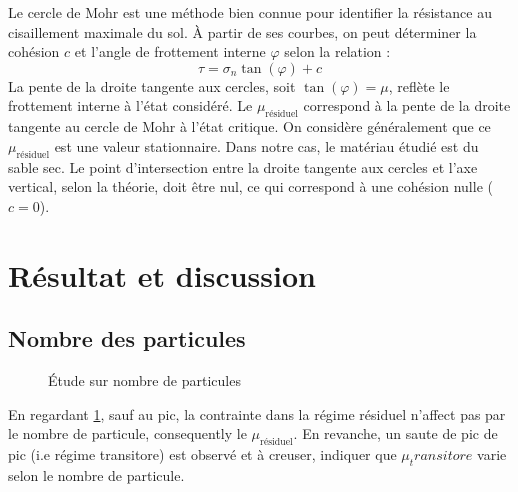 \documentclass[5p,authoryear,square]{elsarticle}
\begin{document}
Le cercle de Mohr est une méthode bien connue pour identifier la résistance au cisaillement maximale du sol.  
À partir de ses courbes, on peut déterminer la cohésion $c$ et l’angle de frottement interne $\varphi$ selon la relation :
\begin{equation}
    \tau = \sigma_n \tan(\varphi) + c
    \label{eq:tangentMohr}
\end{equation}
La pente de la droite tangente aux cercles, soit $\tan(\varphi) = \mu$, reflète le frottement interne à l’état considéré.  
Le $\mu_{\text{résiduel}}$ correspond à la pente de la droite tangente au cercle de Mohr à l’état critique.  
On considère généralement que ce $\mu_{\text{résiduel}}$ est une valeur stationnaire.  
Dans notre cas, le matériau étudié est du sable sec. Le point d’intersection entre la droite tangente aux cercles et l’axe vertical, selon la théorie, doit être nul, ce qui correspond à une cohésion nulle ($c=0$).

\section{Résultat et discussion}\label{resultat}

\subsection{Nombre des particules}\label{N}

            \begin{figure}
                \centering
                \scalebox{0.5}{}
                \caption{Étude sur nombre de particules}
                \label{comparerNP}
            \end{figure}
            En regardant \cref{comparerNP}, sauf au pic, la contrainte dans la régime résiduel n'affect pas par le nombre de particule, consequently le $\mu_{\text{résiduel}}$.
En revanche, un saute de pic de pic (i.e régime transitore) est observé et à creuser, indiquer que $\mu_transitore$ varie selon le nombre de particule.
\end{document}
